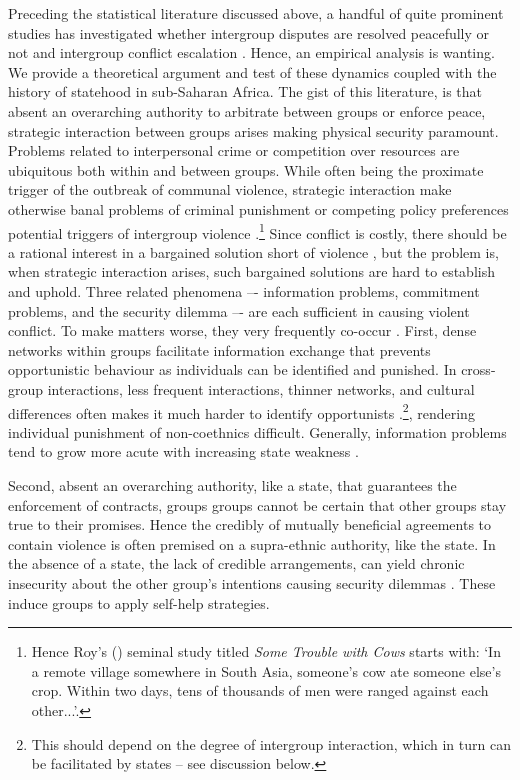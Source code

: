 Preceding the statistical literature discussed above, a handful of quite
prominent studies has investigated whether intergroup disputes are resolved
peacefully or not and intergroup conflict escalation
\citep{Fearon_1996,Lake_1996, Fearon1995}. Hence, an empirical analysis is
wanting. We provide a theoretical argument and test of these dynamics coupled
with the history of statehood in sub-Saharan Africa. The gist of this
literature, is that absent an overarching authority to arbitrate between groups
or enforce peace, strategic interaction between groups arises making physical
security paramount. Problems related to interpersonal crime or competition over
resources are ubiquitous both within and between groups. While often being the
proximate trigger of the outbreak of communal violence, strategic interaction
make otherwise banal problems of criminal punishment or competing policy
preferences potential triggers of intergroup violence \citep{diamond2013world,
	Eaton_2008, Fearon1995, Fearon_1996, Lake_1996}.\footnote{Hence Roy's
		(\citeyear[1]{roy1994some}) seminal study titled \textit{Some
		Trouble with Cows} starts with: `In a remote village somewhere
	in South Asia, someone's cow ate someone else's crop. Within two days,
tens of thousands of men were ranged against each other...'.} Since conflict is
costly, there should be a rational interest in a bargained solution short of
violence \citep{Fearon1995}, but the problem is, when strategic interaction
arises, such bargained solutions are hard to establish and uphold. Three related
phenomena –- information problems, commitment problems, and the security dilemma
–- are each sufficient in causing violent conflict. To make matters worse, they
very frequently co-occur \citep[46]{Lake_1996}. First, dense networks within
groups facilitate information exchange that prevents opportunistic behaviour as
individuals can be identified and punished. In cross-group interactions, less
frequent interactions, thinner networks, and cultural differences often makes it
much harder to identify opportunists \citep[719]{Fearon_1996}.\footnote{This
should depend on the degree of intergroup interaction, which in turn can be
facilitated by states – see discussion below.}, rendering individual punishment
of non-coethnics difficult. Generally, information problems tend to grow more
acute with increasing state weakness \citep[46]{Fearon1995, Lake_1996}.

Second, absent an overarching authority, like a state, that guarantees the
enforcement of contracts, groups groups cannot be certain that other groups stay
true to their promises. Hence the credibly of mutually beneficial agreements to
contain violence is often premised on a supra-ethnic authority, like the state.
In the absence of a state, the lack of credible arrangements, can yield chronic
insecurity about the other group’s intentions causing security dilemmas
\citep[51]{Lake_1996}. These induce groups to apply self-help strategies. 

